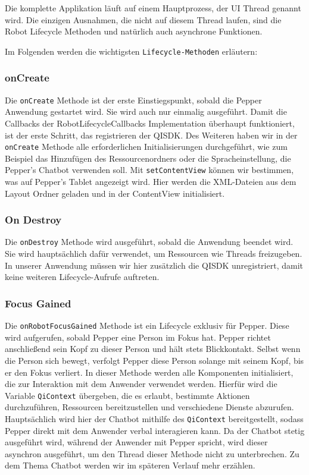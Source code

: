 Die komplette Applikation läuft auf einem Hauptprozess, der UI Thread genannt wird. Die einzigen Ausnahmen, die nicht auf diesem Thread laufen, sind die Robot Lifecycle Methoden und natürlich auch asynchrone Funktionen.

Im Folgenden werden die wichtigsten \verb|Lifecycle-Methoden| erläutern:\\

\subsubsection{onCreate}

Die \verb|onCreate| Methode ist der erste Einstiegspunkt, sobald die Pepper Anwendung gestartet wird. Sie wird auch nur einmalig ausgeführt. Damit die Callbacks der RobotLifecycleCallbacks Implementation überhaupt funktioniert, ist der erste Schritt, das registrieren der QISDK. Des Weiteren haben wir in der \verb|onCreate| Methode alle erforderlichen Initialisierungen durchgeführt, wie zum Beispiel das Hinzufügen des Ressourcenordners oder die Spracheinstellung, die Pepper's Chatbot verwenden soll.
Mit \verb|setContentView| können wir bestimmen, was auf Pepper's Tablet angezeigt wird. Hier werden die XML-Dateien aus dem Layout Ordner geladen und in der ContentView initialisiert. \\

\subsubsection{On Destroy}

Die \verb|onDestroy| Methode wird ausgeführt, sobald die Anwendung beendet wird. Sie wird hauptsächlich dafür verwendet, um Ressourcen wie Threads freizugeben. In unserer Anwendung müssen wir hier zusätzlich die QISDK unregistriert, damit keine weiteren Lifecycle-Aufrufe auftreten. \\

\subsubsection{Focus Gained}

Die \verb|onRobotFocusGained| Methode ist ein Lifecycle exklusiv für Pepper. Diese wird aufgerufen, sobald Pepper eine Person im Fokus hat. Pepper richtet anschließend sein Kopf zu dieser Person und hält stets Blickkontakt. Selbst wenn die Person sich bewegt, verfolgt Pepper diese Person solange mit seinem Kopf, bis er den Fokus verliert. In dieser Methode werden alle Komponenten initialisiert, die zur Interaktion mit dem Anwender verwendet werden. Hierfür wird die Variable \verb|QiContext| übergeben, die es erlaubt, bestimmte Aktionen durchzuführen, Ressourcen bereitzustellen und verschiedene Dienste abzurufen. Hauptsächlich wird hier der Chatbot mithilfe des \verb|QiContext| bereitgestellt, sodass Pepper direkt mit dem Anwender verbal interagieren kann. Da der Chatbot stetig ausgeführt wird, während der Anwender mit Pepper spricht, wird dieser asynchron ausgeführt, um den Thread dieser Methode nicht zu unterbrechen. Zu dem Thema Chatbot werden wir im späteren Verlauf mehr erzählen. \\


